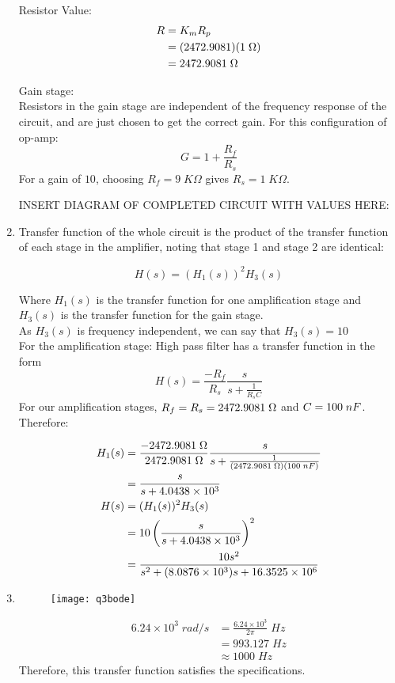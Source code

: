\begin{enumerate}
{	Resistor Value:
	\begin{align*}
	R &= K_m R_p
	\\
	&= (2472.9081)(1 \; \Omega)
	\\
	&= 2472.9081 \; \Omega
	\end{align*}
	
	Gain stage:\\
	Resistors in the gain stage are independent of the frequency response of the circuit, 
	and are just chosen to get the correct gain. For this configuration of op-amp:
	$$ G = 1 + \frac{R_f}{R_s} $$
	For a gain of $10$, choosing $R_f = 9 \; K\Omega$ gives $R_s = 1 \; K\Omega$. 
	
	INSERT DIAGRAM OF COMPLETED CIRCUIT WITH VALUES HERE:
	
	}
	
	\item{
	Transfer function of the whole circuit is the product of the transfer function of
	each stage in the amplifier, noting that stage 1 and stage 2 are identical:
	
	$$ H(s) = (H_1(s))^2 H_3(s) $$
	
	Where $H_1(s)$ is the transfer function for one amplification stage and 
	$H_3(s)$ is the transfer function for the gain stage.\\
	As $H_3(s)$ is frequency independent, we can say that $H_3(s) = 10 $\\
	
	For the amplification stage:
	High pass filter has a transfer function in the form 
	$$H(s) = \frac{-R_f}{R_s}\frac{s}{s + \frac{1}{R_sC}}$$
	For our amplification stages, $R_f = R_s = 2472.9081 \; \Omega$ and $C = 100 \; nF$.
	Therefore:
	
	\begin{align*}
	H_1(s) &= \frac{- 2472.9081 \; \Omega}{2472.9081 \; \Omega} \frac{s}{s + \frac{1}{(2472.9081 \; \Omega)(100 \; nF)}}
	\\
	&= \frac{s}{s + 4.0438 \times 10^3 }
	\\
	H(s) &= (H_1(s))^2H_3(s)
	\\
	&= 10 \left( \frac{s}{s + 4.0438 \times 10^3 } \right)^2 
	\\
	&= \frac{10 s^2}{s^2 + (8.0876\times 10^3) s + 16.3525 \times 10^6}
	\end{align*}
	}
	
	\item{
	\text{}
	\begin{figure}[H]
	\begin{center}
	\texttt{[image: q3bode]}
	\end{center}
	\end{figure}
	}
	\begin{align*}
	6.24 \times 10^3 \; rad/s &= \frac{6.24 \times 10^3}{2\pi} \; Hz
	\\
	&= 993.127 \; Hz
	\\
	&\approx 1000 \; Hz
	\end{align*}
	Therefore, this transfer function satisfies the specifications.
	
	
\end{enumerate}